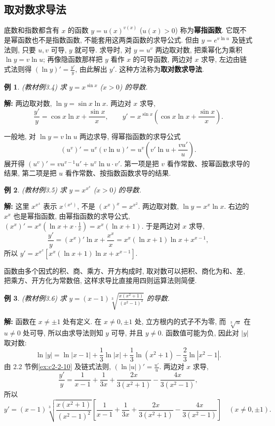 \documentclass[UTF8,openany]{ctexbook}
\theoremstyle{chinesetextbook}
\newtheorem{example}{例}[section]
\newenvironment{cnsolution}{\par\indent\textbf{解:} \ignorespaces}{\par}
\begin{document}
\subsection{取对数求导法}
底数和指数都含有 $x$ 的函数 $y=u(x)^{v(x)}$ ($u(x)>0$) 称为\textbf{幂指函数}. 它既不是幂函数也不是指数函数, 不能套用这两类函数的求导公式. 但由 $y=e^{v\ln u}$ 及链式法则, 只要 $u,v$ 可导, $y$ 就可导. 求导时, 对 $y=u^v$ 两边取对数, 把乘幂化为乘积 $\ln y=v\ln u$; 再像隐函数那样把 $y$ 看作 $x$ 的可导函数, 两边对 $x$ 求导, 左边由链式法则得 $\displaystyle(\ln y)'=\frac{y'}y$, 由此解出 $y'$. 这种方法称为\textbf{取对数求导法}.
\begin{example}\label{ex:c2-3-4}
\textnormal{(教材例3.4)} 求 $y=x^{\sin x}$ ($x>0$) 的导数.
\end{example}
\begin{cnsolution}
两边取对数, $\ln y=\sin x\ln x$. 两边对 $x$ 求导,
\[
\frac{y'}y=\cos x\ln x+\frac{\sin x}x,\qquad y'=x^{\sin x}\left(\cos x\ln x+\frac{\sin x}x\right).
\]
\end{cnsolution}
一般地, 对 $\ln y=v\ln u$ 两边求导, 得幂指函数的求导公式
\[
\left(u^v\right)'=u^v(v\ln u)'=u^v\left(v'\ln u+\frac{vu'}u\right).
\]
展开得 $\left(u^v\right)'=vu^{v-1}u'+u^v\ln u\cdot v'$. 第一项是把 $v$ 看作常数、按幂函数求导的结果, 第二项是把 $u$ 看作常数、按指数函数求导的结果.
\begin{example}\label{ex:c2-3-5}
\textnormal{(教材例3.5)} 求 $y=x^{x^x}$ ($x>0$) 的导数.
\end{example}
\begin{cnsolution}
这里 $x^{x^x}$ 表示 $x^{(x^x)}$, 不是 $(x^x)^x=x^{x^2}$. 两边取对数, $\ln y=x^x\ln x$. 右边的 $x^x$ 也是幂指函数, 由幂指函数的求导公式, $\displaystyle(x^x)'=x^x\left(\ln x+x\cdot\frac1x\right)=x^x(\ln x+1)$. 于是两边对 $x$ 求导,
\[
\frac{y'}y=(x^x)'\ln x+\frac{x^x}x=x^x(\ln x+1)\ln x+x^{x-1},
\]
所以 $y'=x^{x^x}\left[x^x(\ln x+1)\ln x+x^{x-1}\right]$.
\end{cnsolution}
函数由多个因式的积、商、乘方、开方构成时, 取对数可以把积、商化为和、差, 把乘方、开方化为常数倍, 这样求导比直接用四则运算法则简便.
\begin{example}\label{ex:c2-3-6}
\textnormal{(教材例3.6)} 求 $\displaystyle y=(x-1)\sqrt[3]{\frac{x(x^2+1)}{(x^2-1)^2}}$ 的导数.
\end{example}
\begin{cnsolution}
函数在 $x\ne\pm1$ 处有定义. 在 $x\ne0,\pm1$ 处, 立方根内的式子不为零, 而 $\sqrt[3]u$ 在 $u\ne0$ 处可导, 所以由求导法则知 $y$ 可导, 并且 $y\ne0$. 函数值可能为负, 因此对 $|y|$ 取对数:
\[
\ln|y|=\ln|x-1|+\frac13\ln|x|+\frac13\ln(x^2+1)-\frac23\ln|x^2-1|.
\]
由 2.2 节例\ref{ex:c2-2-10} 及链式法则, $\displaystyle(\ln|u|)'=\frac{u'}u$. 两边对 $x$ 求导,
\[
\frac{y'}y=\frac1{x-1}+\frac1{3x}+\frac{2x}{3(x^2+1)}-\frac{4x}{3(x^2-1)},
\]
所以
\[
y'=(x-1)\sqrt[3]{\frac{x(x^2+1)}{(x^2-1)^2}}\left[\frac1{x-1}+\frac1{3x}+\frac{2x}{3(x^2+1)}-\frac{4x}{3(x^2-1)}\right]\quad(x\ne0,\pm1).
\]
\end{cnsolution}
\end{document}
